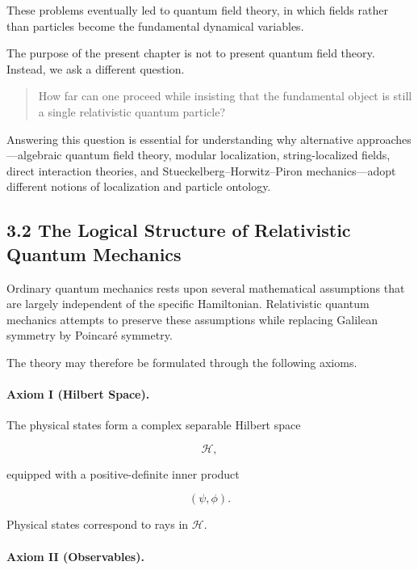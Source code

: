 These problems eventually led to quantum field theory, in which fields rather
than particles become the fundamental dynamical variables.

The purpose of the present chapter is not to present quantum field theory.
Instead, we ask a different question.

\begin{quote}
How far can one proceed while insisting that the fundamental object is still a
single relativistic quantum particle?
\end{quote}

Answering this question is essential for understanding why alternative
approaches---algebraic quantum field theory, modular localization,
string-localized fields, direct interaction theories, and
Stueckelberg--Horwitz--Piron mechanics---adopt different notions of
localization and particle ontology.


\subsection{3.2 The Logical Structure of Relativistic Quantum Mechanics}

Ordinary quantum mechanics rests upon several mathematical assumptions that
are largely independent of the specific Hamiltonian.  Relativistic quantum
mechanics attempts to preserve these assumptions while replacing Galilean
symmetry by Poincaré symmetry.

The theory may therefore be formulated through the following axioms.

\paragraph{Axiom I (Hilbert Space).}

The physical states form a complex separable Hilbert space

\begin{equation}
\mathcal H,
\end{equation}

equipped with a positive-definite inner product

\begin{equation}
(\psi,\phi).
\end{equation}

Physical states correspond to rays in $\mathcal H$.

\paragraph{Axiom II (Observables).}

